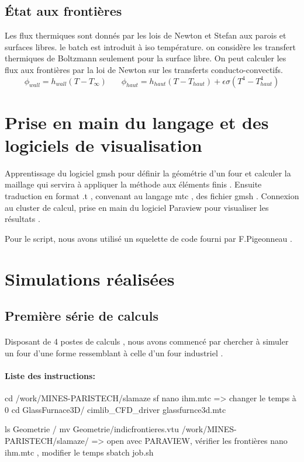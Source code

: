\documentclass[12pt, a4paper, french, BCOR = 0pt, DIV = 10]{scrartcl}
\begin{document}
	\subsection{État aux frontières}
	
	Les flux thermiques sont donnés par les lois de Newton et Stefan aux parois et surfaces libres. le batch est introduit à iso température. on considère les transfert thermiques de Boltzmann seulement pour la surface libre.
	On peut calculer les flux aux frontières par la loi de Newton sur les transferts conducto-convectifs.\\ 
	\centering
	$$
	\phi_{wall} = h_{wall} (T - T_{\infty}) ~~~~~~~~	
	\phi_{haut} = h_{haut} (T - T_{haut}) + \epsilon \sigma (T^4 - T_{haut}^4)
	$$
	
	\section{Prise en main du langage et des logiciels de visualisation}
 	\raggedright
	Apprentissage du logiciel gmsh pour définir la géométrie d'un four et calculer la maillage qui servira à appliquer la méthode aux éléments finis . Ensuite traduction en format .t , convenant au langage mtc , des fichier gmsh . 
	Connexion au cluster de calcul, prise en main du logiciel Paraview pour visualiser les résultats .
	
	Pour le script, nous avons utilisé un squelette de code fourni par F.Pigeonneau .
	
	\section{Simulations réalisées}
	
	\subsection{Première série de calculs}
	\paragraph{}
	 Disposant de 4 postes de calculs , nous avons commencé par chercher à simuler un four  d'une forme ressemblant à celle d'un four industriel .
	 
	 \paragraph{Liste des instructions:}
	 cd /work/MINES-PARISTECH/slamaze
	 sf
	 nano ihm.mtc => changer le temps à 0
	 cd GlassFurnace3D/
	 cimlib_CFD_driver glassfurnce3d.mtc
	 
	 ls Geometrie /
	 mv Geometrie/indicfrontieres.vtu /work/MINES-PARISTECH/slamaze/ => open avec PARAVIEW, vérifier les frontières
	 nano ihm.mtc , modifier le temps
	 sbatch job.sh
	 
	
\end{document}
